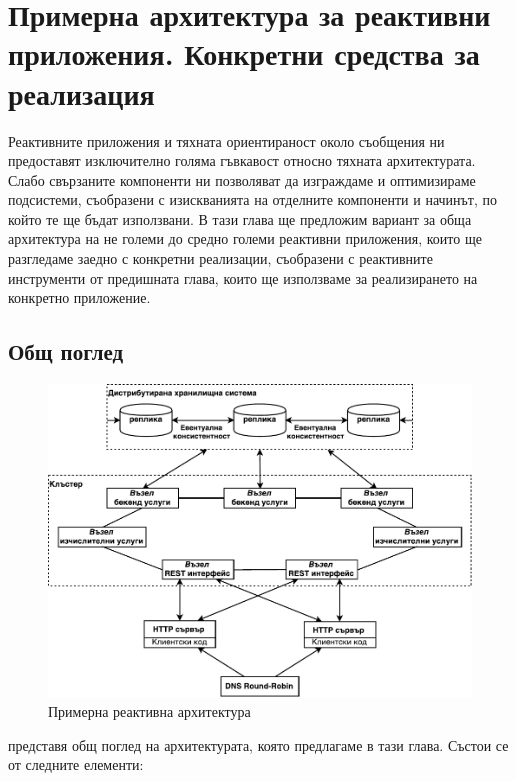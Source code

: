 \chapter{Примерна архитектура за реактивни приложения. Конкретни средства за реализация}
\label{ch:reactive-architecture}

Реактивните приложения и тяхната ориентираност около съобщения ни предоставят изключително голяма гъвкавост относно тяхната архитектурата. Слабо свързаните компоненти ни позволяват да изграждаме и оптимизираме подсистеми, съобразени с изискванията на отделните компоненти и начинът, по който те ще бъдат използвани. В тази глава ще предложим вариант за обща архитектура на не големи до средно големи реактивни приложения, които ще разгледаме заедно с конкретни реализации, съобразени с реактивните инструменти от предишната глава, които ще използваме за реализирането на конкретно приложение.

\section{Общ поглед}

\begin{figure}
  \includegraphics[width=\textwidth]{images/architecture.pdf}
  \caption{Примерна реактивна архитектура}
  \label{fig:reactive-architecture}
\end{figure}

 представя общ поглед на архитектурата, която предлагаме в тази глава. Състои се от следните елементи:

